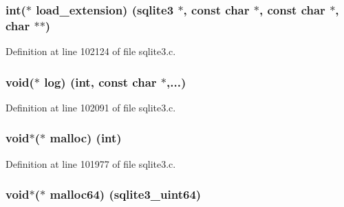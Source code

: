 \subsubsection[{load\+\_\+extension}]{\setlength{\rightskip}{0pt plus 5cm}int($\ast$ load\+\_\+extension) ({\bf sqlite3} $\ast$, const char $\ast$, const char $\ast$, char $\ast$$\ast$)}\label{structsqlite3__api__routines_ad9234c15dcf607e79e3168a32cf9a611}


Definition at line 102124 of file sqlite3.\+c.

\hypertarget{structsqlite3__api__routines_af983b682fce013e15d082e45311d1636}{}
\subsubsection[{log}]{\setlength{\rightskip}{0pt plus 5cm}void($\ast$ log) (int, const char $\ast$,...)}\label{structsqlite3__api__routines_af983b682fce013e15d082e45311d1636}


Definition at line 102091 of file sqlite3.\+c.

\hypertarget{structsqlite3__api__routines_a020ab363e4dd7537af45b0728af40a35}{}
\subsubsection[{malloc}]{\setlength{\rightskip}{0pt plus 5cm}void$\ast$($\ast$ malloc) (int)}\label{structsqlite3__api__routines_a020ab363e4dd7537af45b0728af40a35}


Definition at line 101977 of file sqlite3.\+c.

\hypertarget{structsqlite3__api__routines_ab8c993d0e3cdaa5f343618be6281ff90}{}
\subsubsection[{malloc64}]{\setlength{\rightskip}{0pt plus 5cm}void$\ast$($\ast$ malloc64) ({\bf sqlite3\+\_\+uint64})}\label{structsqlite3__api__routines_ab8c993d0e3cdaa5f343618be6281ff90}


